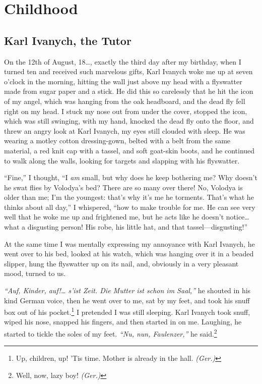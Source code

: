 \part*{Childhood}

\chapter{Karl Ivanych, the Tutor}

On the 12th of August, 18\ldots{}, exactly the third day after my birthday, when I turned ten and received such marvelous gifts, Karl Ivanych woke me up at seven o'clock in the morning, hitting the wall just above my head with a flyswatter made from sugar paper and a stick. He did this so carelessly that he hit the icon of my angel, which was hanging from the oak headboard, and the dead fly fell right on my head. I stuck my nose out from under the cover, stopped the icon, which was still swinging, with my hand, knocked the dead fly onto the floor, and threw an angry look at Karl Ivanych, my eyes still clouded with sleep. He was wearing a motley cotton dressing-gown, belted with a belt from the same material, a red knit cap with a tassel, and soft goat-skin  boots, and he continued to walk along the walls, looking for targets and slapping with his flyswatter.

``Fine,'' I thought, ``I \emph{am} small, but why does he keep bothering me? Why doesn't he swat flies by Volodya's bed? There are so many over there! No, Volodya is older than me; I'm the youngest: that's why it's me he torments. That's what he thinks about all day,'' I whispered, ``how to make trouble for me. He can see very well that he woke me up and frightened me, but he acts like he doesn't notice\ldots{} what a disgusting person! His robe, his little hat, and that tassel---disgusting!'' %

At the same time I was mentally expressing my annoyance with Karl Ivanych, he went over to his bed, looked at his watch, which was hanging over it in a beaded slipper, hung the flyswatter up on its nail, and, obviously in a very pleasant mood, turned to us.

\textit{``Auf, Kinder, auf!\ldots{} s'ist Zeit. Die Mutter ist schon im Saal,''} he shouted in his kind German voice, then he went over to me, sat by my feet, and took his snuff box out of his pocket.\footnote{Up, children, up! 'Tis time. Mother is already in the hall. \textit{(Ger.)}} I pretended I was still sleeping. Karl Ivanych took snuff, wiped his nose, snapped his fingers, and then started in on me. Laughing, he started to tickle the soles of my feet. \textit{``Nu, nun, Faulenzer,''} he said.\footnote{Well, now, lazy boy! \textit{(Ger.)}} %

